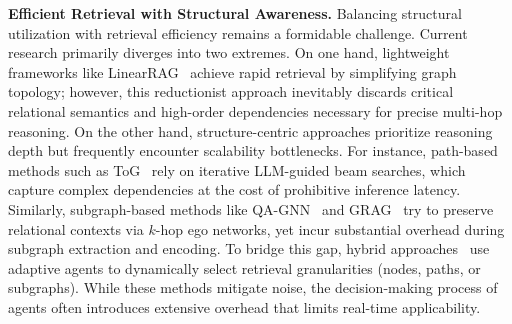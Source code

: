 

\textbf{Efficient Retrieval with Structural Awareness.}
Balancing structural utilization with retrieval efficiency remains a formidable challenge. Current research primarily diverges into two extremes. On one hand, lightweight frameworks like LinearRAG~\cite{zhuang2025linearrag} achieve rapid retrieval by simplifying graph topology; however, this reductionist approach inevitably discards critical relational semantics and high-order dependencies necessary for precise multi-hop reasoning. On the other hand, structure-centric approaches prioritize reasoning depth but frequently encounter scalability bottlenecks. For instance, path-based methods such as ToG~\cite{sun2023think} rely on iterative LLM-guided beam searches, which capture complex dependencies at the cost of prohibitive inference latency. Similarly, subgraph-based methods like QA-GNN~\cite{yasunaga2021qa} and GRAG~\cite{hu2025graggraphretrievalaugmentedgeneration} try to preserve relational contexts via $k$-hop ego networks, yet incur substantial overhead during subgraph extraction and encoding. To bridge this gap, hybrid approaches~\cite{jin2024graph, jiang2025kg} use adaptive agents to dynamically select retrieval granularities (nodes, paths, or subgraphs). While these methods mitigate noise, the decision-making process of agents often introduces extensive overhead that limits real-time applicability. 
